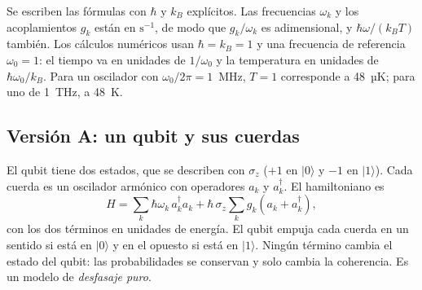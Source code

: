 \documentclass[11pt,a4paper]{article}
\begin{document}
Se escriben las fórmulas con $\hbar$ y $k_B$ explícitos. Las frecuencias $\omega_k$ y los acoplamientos $g_k$ están en $\mathrm{s^{-1}}$, de modo que $g_k/\omega_k$ es adimensional, y $\hbar\omega/(k_BT)$ también. Los cálculos numéricos usan $\hbar = k_B = 1$ y una frecuencia de referencia $\omega_0 = 1$: el tiempo va en unidades de $1/\omega_0$ y la temperatura en unidades de $\hbar\omega_0/k_B$. Para un oscilador con $\omega_0/2\pi = 1$~MHz, $T = 1$ corresponde a 48~µK; para uno de 1~THz, a 48~K.

\subsection{Versión A: un qubit y sus cuerdas}\label{sec:modeloA}

El qubit tiene dos estados, que se describen con $\sigma_z$ ($+1$ en $|0\rangle$ y $-1$ en $|1\rangle$). Cada cuerda es un oscilador armónico con operadores $a_k$ y $a_k^\dagger$. El hamiltoniano es
\begin{equation}\label{eq:hamA}
H = \sum_k \hbar\omega_k\, a_k^\dagger a_k + \hbar\,\sigma_z \sum_k g_k \left(a_k + a_k^\dagger\right),
\end{equation}
con los dos términos en unidades de energía. El qubit empuja cada cuerda en un sentido si está en $|0\rangle$ y en el opuesto si está en $|1\rangle$. Ningún término cambia el estado del qubit: las probabilidades se conservan y solo cambia la coherencia. Es un modelo de \emph{desfasaje puro}.
\end{document}
